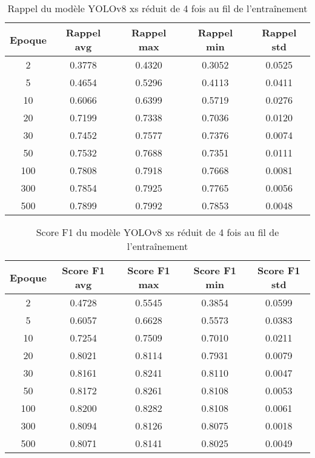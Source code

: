\begin{table}[!ht]
    \caption{Rappel du modèle YOLOv8 xs réduit de 4 fois au fil de l'entraînement}
    \label{tab:yolov8xs_reduced4x_rappel}
    \centering
    \begin{tabular}{ |c||c|c|c|c|  }
        \hline
        \rowcolor{gray!50}
        Epoque & Rappel avg & Rappel max & Rappel min & Rappel std\\
        \hline
        2 & 0.3778 & 0.4320 & 0.3052 & 0.0525\\
        5 & 0.4654 & 0.5296 & 0.4113 & 0.0411\\
        10 & 0.6066 & 0.6399 & 0.5719 & 0.0276\\
        20 & 0.7199 & 0.7338 & 0.7036 & 0.0120\\
        30 & 0.7452 & 0.7577 & 0.7376 & 0.0074\\
        50 & 0.7532 & 0.7688 & 0.7351 & 0.0111\\
        100 & 0.7808 & 0.7918 & 0.7668 & 0.0081\\
        300 & 0.7854 & 0.7925 & 0.7765 & 0.0056\\
        500 & 0.7899 & 0.7992 & 0.7853 & 0.0048\\
        \hline
    \end{tabular}
\end{table}

\begin{table}[!ht]
    \caption{Score F1 du modèle YOLOv8 xs réduit de 4 fois au fil de l'entraînement}
    \label{tab:yolov8xs_reduced4x_f1score}
    \centering
    \begin{tabular}{ |c||c|c|c|c|  }
        \hline
        \rowcolor{gray!50}
        Epoque & Score F1 avg & Score F1 max & Score F1 min & Score F1 std\\
        \hline
        2 & 0.4728 & 0.5545 & 0.3854 & 0.0599\\
        5 & 0.6057 & 0.6628 & 0.5573 & 0.0383\\
        10 & 0.7254 & 0.7509 & 0.7010 & 0.0211\\
        20 & 0.8021 & 0.8114 & 0.7931 & 0.0079\\
        30 & 0.8161 & 0.8241 & 0.8110 & 0.0047\\
        50 & 0.8172 & 0.8261 & 0.8108 & 0.0053\\
        100 & 0.8200 & 0.8282 & 0.8108 & 0.0061\\
        300 & 0.8094 & 0.8126 & 0.8075 & 0.0018\\
        500 & 0.8071 & 0.8141 & 0.8025 & 0.0049\\
        \hline
    \end{tabular}
\end{table}

